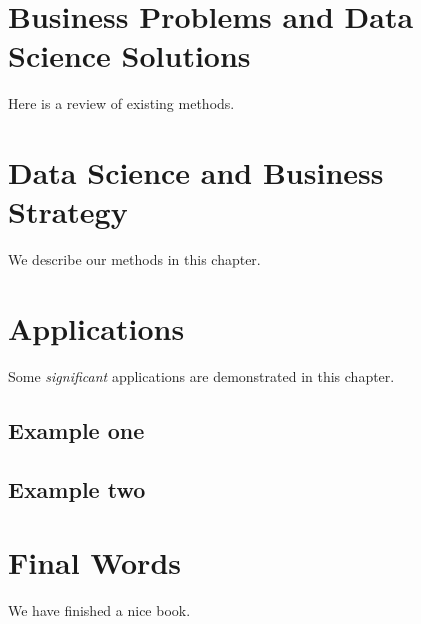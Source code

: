 \documentclass[
]{book}
\begin{document}
\hypertarget{businessproblems}{%
\chapter{Business Problems and Data Science Solutions}\label{businessproblems}}

Here is a review of existing methods.

\hypertarget{businessstrategy}{%
\chapter{Data Science and Business Strategy}\label{businessstrategy}}

We describe our methods in this chapter.

\hypertarget{applications}{%
\chapter{Applications}\label{applications}}

Some \emph{significant} applications are demonstrated in this chapter.

\hypertarget{example-one}{%
\section{Example one}\label{example-one}}

\hypertarget{example-two}{%
\section{Example two}\label{example-two}}

\hypertarget{final-words}{%
\chapter{Final Words}\label{final-words}}

We have finished a nice book.

  
\end{document}
